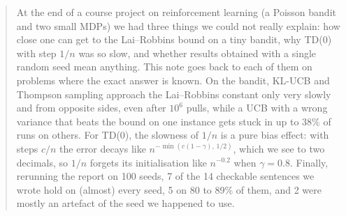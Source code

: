 \begin{abstract}
\noindent At the end of a course project on reinforcement learning (a Poisson bandit and two small MDPs) we had three things we could not really explain: how close one can get to the Lai--Robbins bound on a tiny bandit, why TD(0) with step $1/n$ was so slow, and whether results obtained with a single random seed mean anything. This note goes back to each of them on problems where the exact answer is known. On the bandit, KL-UCB and Thompson sampling approach the Lai--Robbins constant only very slowly and from opposite sides, even after $10^6$ pulls, while a UCB with a wrong variance that beats the bound on one instance gets stuck in up to $38\%$ of runs on others. For TD(0), the slowness of $1/n$ is a pure bias effect: with steps $c/n$ the error decays like $n^{-\min(c(1-\gamma),\,1/2)}$, which we see to two decimals, so $1/n$ forgets its initialisation like $n^{-0.2}$ when $\gamma = 0.8$. Finally, rerunning the report on 100 seeds, 7 of the 14 checkable sentences we wrote hold on (almost) every seed, 5 on 80 to 89\% of them, and 2 were mostly an artefact of the seed we happened to use.
\end{abstract}
